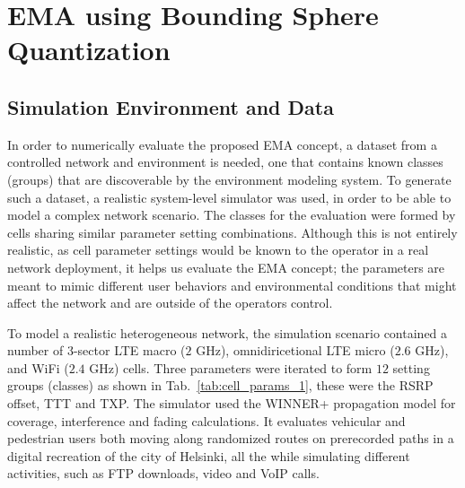 	\section{EMA using Bounding Sphere Quantization}
		\label{cha:ema:sec:ema_bsq}
	
		\subsection{Simulation Environment and Data}
		
			In order to numerically evaluate the proposed \ac{EMA} concept, a dataset from a controlled network and environment is needed, one that contains known classes (groups) that are discoverable by the environment modeling system.
			To generate such a dataset, a realistic system-level simulator was used, in order to be able to model a complex network scenario.
			The classes for the evaluation were formed by cells sharing similar parameter setting combinations. 
			Although this is not entirely realistic, as cell parameter settings would be known to the operator in a real network deployment, it helps us evaluate the EMA concept; the parameters are meant to mimic different user behaviors and environmental conditions that might affect the network and are outside of the operators control.
			
			To model a realistic heterogeneous network, the simulation scenario contained a number of $3$-sector \ac{LTE} macro ($2$ GHz), omnidiricetional \ac{LTE} micro ($2.6$ GHz), and WiFi ($2.4$ GHz) cells.
			Three parameters were iterated to form $12$ setting groups (classes) as shown in Tab.~\ref{tab:cell_params_1}, these were the \ac{RSRP} offset, \ac{TTT} and \ac{TXP}.
			The simulator used the WINNER+ propagation model \cite{winner_plus} for coverage, interference and fading calculations.
			It evaluates vehicular and pedestrian users both moving along randomized routes on prerecorded paths in a digital recreation of the city of Helsinki, all the while simulating different activities, such as \ac{FTP} downloads, video and \ac{VoIP} calls.
			
